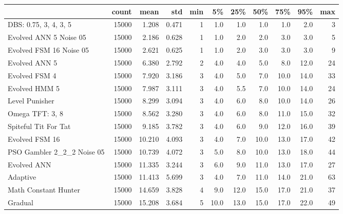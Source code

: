 \begin{tabular}{lrrrrrrrrrr}
\toprule
{} &  count &    mean &    std &  min &    5\% &   25\% &   50\% &   75\% &   95\% &  max \\
\midrule
DBS: 0.75, 3, 4, 3, 5      &  15000 &   1.208 &  0.471 &    1 &   1.0 &   1.0 &   1.0 &   1.0 &   2.0 &    3 \\
Evolved ANN 5 Noise 05     &  15000 &   2.186 &  0.628 &    1 &   1.0 &   2.0 &   2.0 &   3.0 &   3.0 &    5 \\
Evolved FSM 16 Noise 05    &  15000 &   2.621 &  0.625 &    1 &   1.0 &   2.0 &   3.0 &   3.0 &   3.0 &    9 \\
Evolved ANN 5              &  15000 &   6.380 &  2.792 &    2 &   4.0 &   4.0 &   5.0 &   8.0 &  12.0 &   24 \\
Evolved FSM 4              &  15000 &   7.920 &  3.186 &    3 &   4.0 &   5.0 &   7.0 &  10.0 &  14.0 &   33 \\
Evolved HMM 5              &  15000 &   7.987 &  3.111 &    3 &   4.0 &   5.5 &   7.0 &  10.0 &  14.0 &   24 \\
Level Punisher             &  15000 &   8.299 &  3.094 &    3 &   4.0 &   6.0 &   8.0 &  10.0 &  14.0 &   26 \\
Omega TFT: 3, 8            &  15000 &   8.562 &  3.280 &    3 &   4.0 &   6.0 &   8.0 &  11.0 &  15.0 &   32 \\
Spiteful Tit For Tat       &  15000 &   9.185 &  3.782 &    3 &   4.0 &   6.0 &   9.0 &  12.0 &  16.0 &   39 \\
Evolved FSM 16             &  15000 &  10.210 &  4.093 &    3 &   4.0 &   7.0 &  10.0 &  13.0 &  17.0 &   42 \\
PSO Gambler 2\_2\_2 Noise 05 &  15000 &  10.739 &  4.072 &    3 &   5.0 &   8.0 &  10.0 &  13.0 &  18.0 &   44 \\
Evolved ANN                &  15000 &  11.335 &  3.244 &    3 &   6.0 &   9.0 &  11.0 &  13.0 &  17.0 &   27 \\
Adaptive                   &  15000 &  11.413 &  5.699 &    3 &   4.0 &   7.0 &  11.0 &  14.0 &  21.0 &   63 \\
Math Constant Hunter       &  15000 &  14.659 &  3.828 &    4 &   9.0 &  12.0 &  15.0 &  17.0 &  21.0 &   37 \\
Gradual                    &  15000 &  15.208 &  3.684 &    5 &  10.0 &  13.0 &  15.0 &  17.0 &  22.0 &   49 \\
\bottomrule
\end{tabular}
